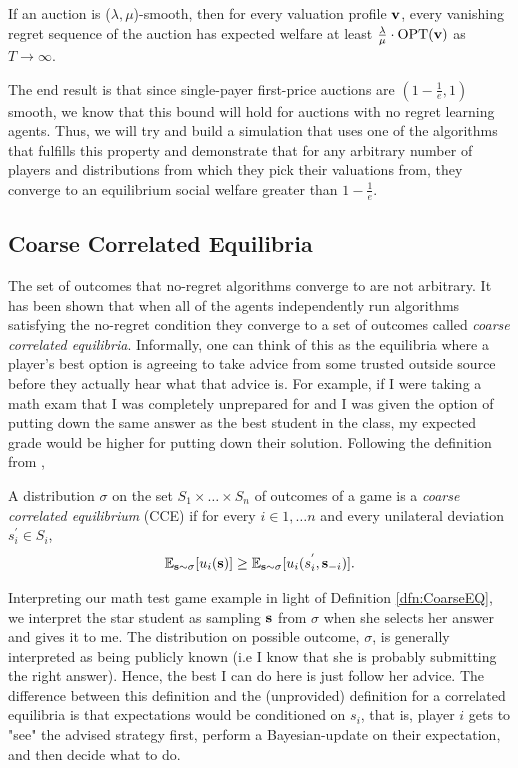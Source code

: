 \documentclass[12pt,twoside]{reedthesis}
\begin{document}
\begin{theorem}
	If an auction is ($\lambda, \mu$)-smooth, then for every valuation profile $\textbf{v}$, every vanishing regret sequence of the auction has expected welfare at least $\frac{\lambda}{\mu} \cdot \text{OPT}(\textbf{v})$ as $T \rightarrow \infty$. 
\end{theorem}

The end result is that since single-payer first-price auctions are $(1-\frac{1}{e}, 1)$ smooth, we know that this bound will hold for auctions with no regret learning agents. Thus, we will try and build a simulation that uses one of the algorithms that fulfills this property and demonstrate that for any arbitrary number of players and distributions from which they pick their valuations from, they converge to an equilibrium social welfare greater than $1-\frac{1}{e}$.

\label{sec:No-Regret-Learning}
\subsection{Coarse Correlated Equilibria}
The set of outcomes that no-regret algorithms converge to are not arbitrary. It has been shown that when all of the agents independently run algorithms satisfying the no-regret condition they converge to a set of outcomes called {\em coarse correlated equilibria}. Informally, one can think of this as the equilibria where a player's best option is agreeing to take advice from some trusted outside source before they actually hear what that advice is. For example, if I were taking a math exam that I was completely unprepared for and I was given the option of putting down the same answer as the best student in the class, my expected grade would be higher for putting down their solution. Following the definition from \cite{Roughgarden2016},
\begin{dfn}
	A distribution $\sigma$ on the set $S_1 \times \ldots \times S_n$ of outcomes of a game is a {\em coarse correlated equilibrium} (CCE) if for every $i \in {1, \ldots n}$ and every unilateral deviation $s_i^{'} \in S_i$,
	$$\mathbb{E}_{\textbf{s} \sim \sigma}[u_i(\textbf{s})] \geq \mathbb{E}_{\textbf{s} \sim \sigma}[u_i(s_i^{'}, \textbf{s}_{-i})].$$
	\label{dfn:CoarseEQ}
\end{dfn}

Interpreting our math test game example in light of Definition \ref{dfn:CoarseEQ}, we interpret the star student as sampling $\textbf{s}$ from $\sigma$ when she selects her answer and gives it to me. The distribution on possible outcome, $\sigma$, is generally interpreted as being publicly known (i.e I know that she is probably submitting the right answer). Hence, the best I can do here is just follow her advice. The difference between this definition and the (unprovided) definition for a correlated equilibria is that expectations would be conditioned on $s_i$, that is, player $i$ gets to "see" the advised strategy first, perform a Bayesian-update on their expectation, and then decide what to do. 
\end{document}

